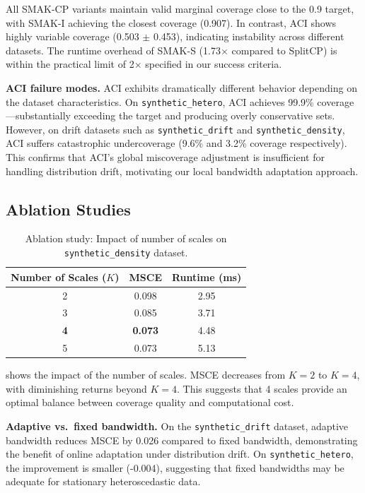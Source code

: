 \documentclass{article}
\theoremstyle{definition}
\begin{document}
All SMAK-CP variants maintain valid marginal coverage close to the 0.9 target, with SMAK-I achieving the closest coverage (0.907). In contrast, ACI shows highly variable coverage (0.503 $\pm$ 0.453), indicating instability across different datasets. The runtime overhead of SMAK-S (1.73$\times$ compared to SplitCP) is within the practical limit of 2$\times$ specified in our success criteria.

\textbf{ACI failure modes.} ACI exhibits dramatically different behavior depending on the dataset characteristics. On \texttt{synthetic\_hetero}, ACI achieves 99.9\% coverage---substantially exceeding the target and producing overly conservative sets. However, on drift datasets such as \texttt{synthetic\_drift} and \texttt{synthetic\_density}, ACI suffers catastrophic undercoverage (9.6\% and 3.2\% coverage respectively). This confirms that ACI's global miscoverage adjustment is insufficient for handling distribution drift, motivating our local bandwidth adaptation approach.

\subsection{Ablation Studies}

\begin{table}[t]
\caption{Ablation study: Impact of number of scales on \texttt{synthetic\_density} dataset.}
\label{tab:ablation}
\centering
\begin{tabular}{ccc}
\toprule
Number of Scales ($K$) & MSCE & Runtime (ms) \\
\midrule
2 & 0.098 & 2.95 \\
3 & 0.085 & 3.71 \\
\textbf{4} & \textbf{0.073} & 4.48 \\
5 & 0.073 & 5.13 \\
\bottomrule
\end{tabular}
\end{table}

 shows the impact of the number of scales. MSCE decreases from $K=2$ to $K=4$, with diminishing returns beyond $K=4$. This suggests that 4 scales provide an optimal balance between coverage quality and computational cost.

\textbf{Adaptive vs.~fixed bandwidth.} On the \texttt{synthetic\_drift} dataset, adaptive bandwidth reduces MSCE by 0.026 compared to fixed bandwidth, demonstrating the benefit of online adaptation under distribution drift. On \texttt{synthetic\_hetero}, the improvement is smaller (-0.004), suggesting that fixed bandwidths may be adequate for stationary heteroscedastic data.
\end{document}
